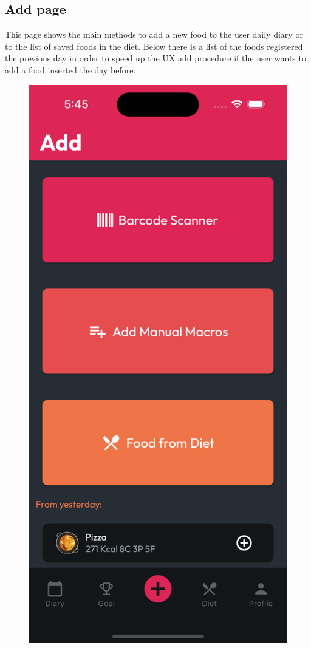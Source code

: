\documentclass{Configuration_Files/PoliMi3i_thesis}
\begin{document}
\subsection{Add page}

\begin{minipage}{\linewidth}
    This page shows the main methods to add a new food to the user daily diary or to the list of saved foods in the diet. Below there is a list of the foods registered the previous day in order to speed up the UX add procedure if the user wants to add a food inserted the day before.
\end{minipage}

\begin{figure}[!h]
  \centering
  \includegraphics[scale=0.1]{Images/Screenshots/Mobile/Add.png}

\end{figure}
\end{document}

